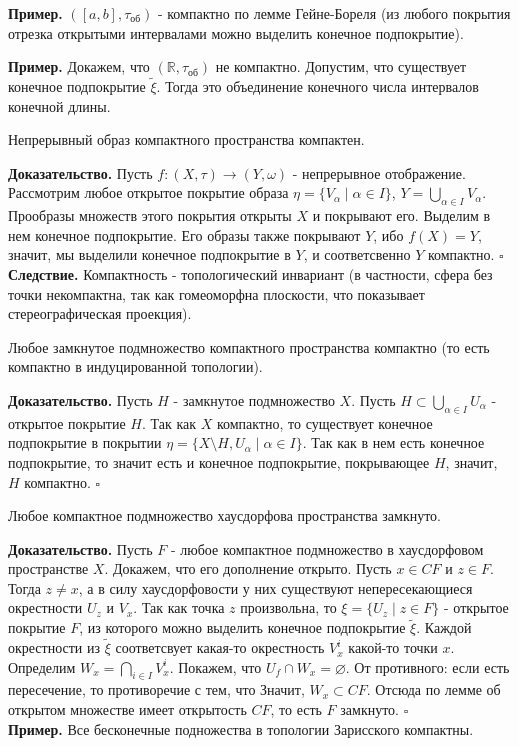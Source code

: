 \textbf{Пример.} $([a,b],\tau_{об})$ - компактно по лемме Гейне-Бореля 
(из любого покрытия отрезка открытыми интервалами можно выделить конечное
подпокрытие). 

\textbf{Пример.} Докажем, что $(\mathbb{R},\tau_\text{об})$ не компактно.
Допустим, что существует конечное подпокрытие $\tilde \xi$. Тогда это
объединение конечного числа интервалов конечной длины. 

\begin{theor}
    Непрерывный образ компактного пространства компактен.
\end{theor}
\textbf{Доказательство.}  Пусть $f\colon(X,\tau)\to(Y,\omega)$ - непрерывное 
отображение. Рассмотрим любое открытое покрытие образа $\eta=\{V_\alpha\mid
\alpha\in I\}$, $Y=\bigcup\limits_{\alpha\in I} V_\alpha$. Прообразы
множеств этого покрытия открыты  $X$ и покрывают его. Выделим в нем конечное
подпокрытие. Его образы также покрывают  $Y$, ибо  $f(X)=Y$, значит, мы 
выделили конечное подпокрытие в  $Y$, и соответсвенно  $Y$ компактно.
$\square$ \\
\textbf{Следствие.} Компактность - топологический инвариант (в частности, 
сфера без точки некомпактна, так как гомеоморфна плоскости, что показывает
стереографическая проекция). 
\begin{theor}
Любое замкнутое подмножество компактного пространства компактно (то есть
компактно в индуцированной топологии).
\end{theor}
\textbf{Доказательство.} Пусть $H$ - замкнутое подмножество  $X$. 
Пусть  $H\subset \bigcup\limits_{\alpha\in I} U_\alpha$ - открытое покрытие
$H$. Так как  $X$ компактно, то существует конечное подпокрытие в 
покрытии  $\eta=\{X\setminus H,U_\alpha\mid\alpha\in I\}$. Так как в нем 
есть конечное подпокрытие, то значит есть и конечное подпокрытие, 
покрывающее $H$, значит, $H$ компактно. $\square$ 
\begin{theor}
Любое компактное подмножество хаусдорфова пространства замкнуто.
\end{theor}
\textbf{Доказательство.} Пусть $F$ - любое компактное подмножество в
хаусдорфовом пространстве $X$. Докажем, что его дополнение открыто. Пусть
 $x\in CF$ и $z\in F$. Тогда $z\ne x$, а в силу хаусдорфовости у них 
 существуют непересекающиеся окрестности  $U_z$ и  $V_x$. Так как точка
$z$ произвольна, то  $\xi=\{U_z\mid z\in F\}$ - открытое покрытие $F$, из
которого можно выделить конечное подпокрытие  $\tilde\xi$. Каждой окрестности
из $\tilde\xi$ соответсвует какая-то окрестность $V^i_x$ какой-то точки
$x$. Определим  $W_x=\bigcap\limits_{i \in  I} V^i_x$. Покажем, что 
$U_f\cap W_x=\varnothing$. От противного: если есть пересечение, то 
противоречие с тем, что 
Значит, $W_x\subset CF$. Отсюда по лемме об открытом множестве имеет
открытость $CF$, то есть  $F$ замкнуто.
$\square$ \\
\textbf{Пример.} Все бесконечные подножества в топологии Зарисского
компактны. 


